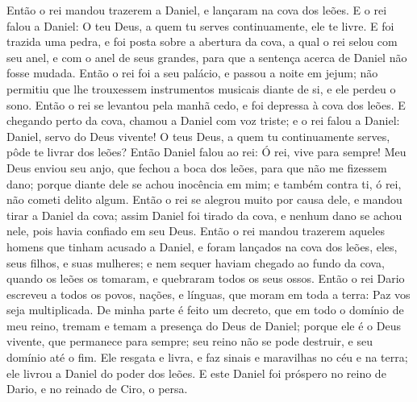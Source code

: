 {Então o rei mandou trazerem a Daniel, e
{} lançaram na cova dos leões. E o rei falou a Daniel: O teu Deus, a quem tu serves continuamente, ele te livre.
E foi trazida uma pedra, e foi posta sobre a abertura da cova, a qual o rei selou com seu anel, e com o anel de seus grandes, para que a sentença acerca de Daniel não fosse mudada.
Então o rei foi a seu palácio, e passou a noite em jejum; não permitiu que lhe trouxessem instrumentos musicais diante de si, e ele perdeu o sono.
Então o rei se levantou pela manhã cedo, e foi depressa à cova dos leões.
E chegando perto da cova, chamou a Daniel com voz triste; e o rei falou a Daniel: Daniel, servo do Deus vivente! O teus Deus, a quem tu continuamente serves, pôde te livrar dos leões?
Então Daniel falou ao rei: Ó rei, vive para sempre!
Meu Deus enviou seu anjo, que fechou a boca dos leões, para que não me fizessem dano; porque diante dele se achou inocência em mim; e também contra ti, ó rei, não cometi delito algum.
Então o rei se alegrou muito por causa dele, e mandou tirar a Daniel da cova; assim Daniel foi tirado da cova, e nenhum dano se achou nele, pois havia confiado em seu Deus.
Então o rei mandou trazerem aqueles homens que tinham acusado a Daniel, e foram lançados na cova dos leões, eles, seus filhos, e suas mulheres; e nem sequer haviam chegado ao fundo da cova, quando os leões os tomaram, e quebraram todos os seus ossos.
Então o rei Dario escreveu a todos os povos, nações, e línguas, que moram em toda a terra: Paz vos seja multiplicada.
De minha parte é feito um decreto, que em todo o domínio de meu reino,
{} tremam e temam a presença do Deus de Daniel; porque ele é o Deus vivente, que permanece para sempre; seu reino não se pode destruir, e seu domínio
{} até o fim.
Ele resgata e livra, e faz sinais e maravilhas no céu e na terra; ele livrou a Daniel do poder dos leões.
E este Daniel foi próspero no reino de Dario, e no reinado de Ciro, o persa.

\par }

